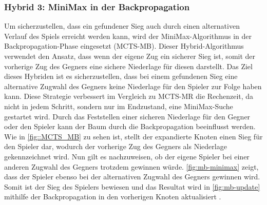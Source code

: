 \documentclass[12pt,a4paper,bibliography=totocnumbered,listof=totocnumbered]{article}
\begin{document}
\subsubsection{Hybrid 3: MiniMax in der Backpropagation}
Um sicherzustellen, dass ein gefundener Sieg auch durch einen alternativen Verlauf des Spiels erreicht werden kann, wird der MiniMax-Algorithmus in der Backpropagation-Phase eingesetzt (MCTS-MB).  Dieser Hybrid-Algorithmus verwendet den Ansatz, dass wenn der eigene Zug ein sicherer Sieg ist, somit der vorherige Zug des Gegners eine sichere Niederlage für diesen darstellt. Das Ziel dieses Hybriden ist es sicherzustellen, dass bei einem gefundenen Sieg eine alternative Zugwahl des Gegners keine Niederlage für den Spieler zur Folge haben kann. Diese Strategie verbessert im Vergleich zu MCTS-MR die Rechenzeit, da nicht in jedem Schritt, sondern nur im Endzustand, eine MiniMax-Suche gestartet wird. Durch das Feststellen einer sicheren Niederlage für den Gegner oder den Spieler kann der Baum durch die Backpropagation beeinflusst werden.
Wie in \autoref{fig::MCTS_MB} zu sehen ist, stellt der expandierte Knoten einen Sieg für den Spieler dar, wodurch der vorherige Zug des Gegners als Niederlage gekennzeichnet wird. Nun gilt es nachzuweisen, ob der eigene Spieler bei einer anderen Zugwahl des Gegners trotzdem gewinnen würde. \autoref{fig:mb-minimax} zeigt, dass der Spieler ebenso bei der alternativen Zugwahl des Gegners gewinnen wird. Somit ist der Sieg des Spielers bewiesen und das Resultat wird in \autoref{fig:mb-update} mithilfe der Backpropagation in den vorherigen Knoten aktualisiert \citep{Baier.2015}.
\end{document}
